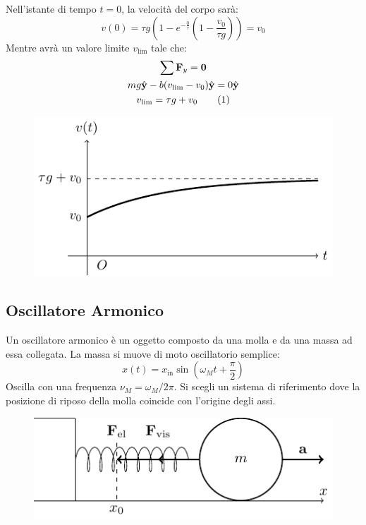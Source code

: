 \documentclass{article}
\newcommand{\vect}[1]{\boldsymbol{\mathbf{#1}}}
\numberwithin{equation}{subsection}
\begin{document}
Nell'istante di tempo $t=0$, la velocità del corpo sarà: 
\begin{equation*}
    v(0)=\tau g\left(1-e^{ -\frac{0}{\tau}}\left(1-\displaystyle\frac{v_0}{\tau g}\right)\right)=v_0
\end{equation*} 
Mentre avrà un valore limite $v_{\lim}$ tale che:
\begin{gather*}
    \sum\vect{F}_y=\vect{0}\\
     mg\hat{\vect{y}}-b(v_{\lim}-v_0)\hat{\vect{y}}=0\hat{\vect{y}}\\
    v_{\lim}=\tau g +v_0\tag{\stepcounter{equation}\theequation}
\end{gather*}
\begin{figure}[H]%
    \centering
    \includegraphics{andamento-viscoso.pdf}%
\end{figure}

\subsection{Oscillatore Armonico}
Un oscillatore armonico è un oggetto composto da una molla e 
da una massa ad essa collegata. La massa si muove di moto 
oscillatorio semplice: 
\begin{equation*}
    x(t)=x_\mathrm{in}\sin\left(\omega_Mt+\displaystyle\frac{\pi}{2}\right)
\end{equation*}
Oscilla con una frequenza $\nu_M=\omega_M/2\pi$. 
Si scegli un sistema di riferimento dove la posizione di riposo 
della molla coincide con l'origine degli assi.
\begin{figure}[H]%
    \centering
    \includegraphics{oscillatore-armonico}%
\end{figure}
\end{document}
